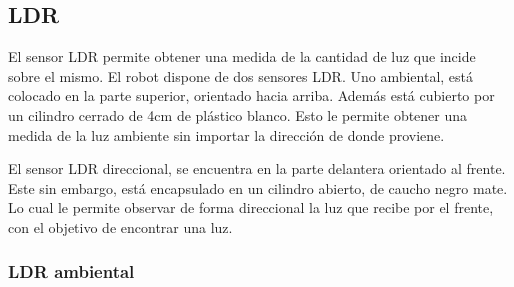 \documentclass[10pt,a4paper,hidelinks]{article}
\begin{document}
\begin{multicols}{2}
\subsection{LDR}

El sensor LDR permite obtener una medida de la cantidad de luz que incide sobre
el mismo. El robot dispone de dos sensores LDR. Uno ambiental, está colocado en
la parte superior, orientado hacia arriba. Además está cubierto por un cilindro
cerrado de 4cm de plástico blanco. Esto le permite obtener una medida de la luz
ambiente sin importar la dirección de donde proviene.

El sensor LDR direccional, se encuentra en la parte delantera orientado al 
frente. Este sin embargo, está encapsulado en un cilindro abierto, de caucho 
negro mate. Lo cual le permite observar de forma direccional la luz que recibe 
por el frente, con el objetivo de encontrar una luz.

\subsubsection{LDR ambiental}

%
%
%
%
%
%



\end{multicols}
\end{document}
